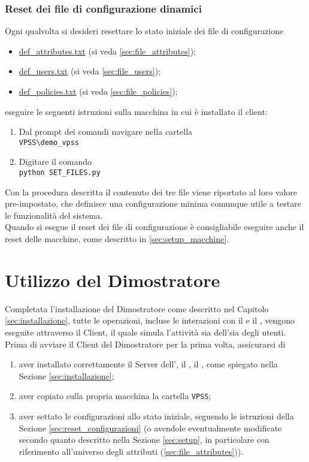 \documentclass[a4paper,twoside,10pt,openany]{scrbook}
\begin{document}
\subsection{Reset dei file di configurazione dinamici}\label{sec:setup_file_users}
Ogni qualvolta si desideri resettare lo stato iniziale dei file di configurazione
\begin{itemize}
 \item \hyperref[sec:file_attributes]{def\_attributes.txt} (si veda \ref{sec:file_attributes});
 \item \hyperref[sec:file_users]{def\_users.txt} (si veda \ref{sec:file_users});
 \item \hyperref[sec:file_policies]{def\_policies.txt} (si veda \ref{sec:file_policies});
\end{itemize}
eseguire le seguenti istruzioni sulla macchina in cui è installato il client:
\begin{enumerate}
 \item Dal prompt dei comandi navigare nella cartella\\
      \texttt{VPSS\textbackslash demo\_vpss}
 \item Digitare il comando\\
      \texttt{python SET\_FILES.py}
\end{enumerate}
Con la procedura descritta il contenuto dei tre file viene riportato al loro valore pre-impostato, che definisce una configurazione minima comunque utile a testare le funzionalità del sistema.\\
Quando si esegue il reset dei file di configurazione è consigliabile eseguire anche il reset delle macchine, come descritto in \ref{sec:setup_macchine}.
 
 
%
\chapter{Utilizzo del Dimostratore}\label{sec:utilizzo}
%
Completata l'installazione del Dimostratore come descritto nel Capitolo \ref{sec:installazione}, tutte le operazioni, incluse le interazioni con il \sa e il \sr,  vengono eseguite attraverso il Client, il quale simula l'attività sia dell'\auth sia degli utenti.\\
Prima di avviare il Client del Dimostratore per la prima volta, assicurarsi di 
\begin{enumerate}
 \item aver installato correttamente il Server dell'\auth, il \sr, il \sa, come spiegato nella Sezione \ref{sec:installazione};
 \item aver copiato sulla propria macchina la cartella \texttt{VPSS};
 \item aver settato le configurazioni allo stato iniziale, seguendo le istruzioni della Sezione \ref{sec:reset_configurazioni} (o avendole eventualmente modificate secondo quanto descritto nella Sezione \ref{sec:setup}, in particolare con riferimento all'universo degli attributi (\ref{sec:file_attributes})).
\end{enumerate}
%
\end{document}

